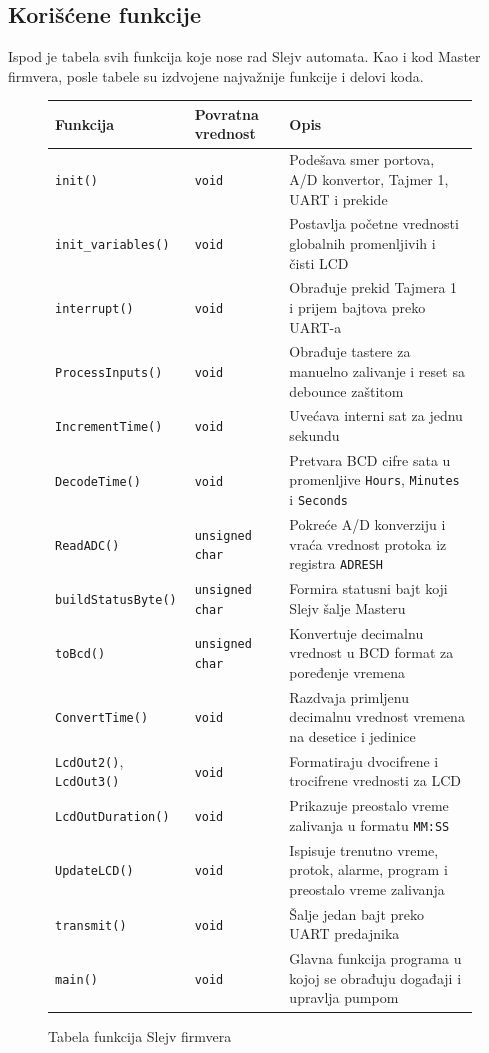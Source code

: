 \documentclass[12pt]{article}
\numberwithin{figure}{section}
\begin{document}
  \clearpage

  \subsection{Korišćene funkcije}
  Ispod je tabela svih funkcija koje nose rad Slejv automata. Kao i kod Master firmvera, posle tabele su izdvojene najvažnije funkcije i delovi koda.

  \begin{figure}[ht]
  \centering
  \small
  \begin{tabular}{|m{3.8cm}|m{3cm}|m{6.8cm}|}
    \hline
    Funkcija & Povratna vrednost & Opis \\ \hline
    \texttt{init()} & \texttt{void} & Podešava smer portova, A/D konvertor, Tajmer 1, UART i prekide \\ \hline
    \texttt{init\_variables()} & \texttt{void} & Postavlja početne vrednosti globalnih promenljivih i čisti LCD \\ \hline
    \texttt{interrupt()} & \texttt{void} & Obrađuje prekid Tajmera 1 i prijem bajtova preko UART-a \\ \hline
    \texttt{ProcessInputs()} & \texttt{void} & Obrađuje tastere za manuelno zalivanje i reset sa debounce zaštitom \\ \hline
    \texttt{IncrementTime()} & \texttt{void} & Uvećava interni sat za jednu sekundu \\ \hline
    \texttt{DecodeTime()} & \texttt{void} & Pretvara BCD cifre sata u promenljive \texttt{Hours}, \texttt{Minutes} i \texttt{Seconds} \\ \hline
    \texttt{ReadADC()} & \texttt{unsigned char} & Pokreće A/D konverziju i vraća vrednost protoka iz registra \texttt{ADRESH} \\ \hline
    \texttt{buildStatusByte()} & \texttt{unsigned char} & Formira statusni bajt koji Slejv šalje Masteru \\ \hline
    \texttt{toBcd()} & \texttt{unsigned char} & Konvertuje decimalnu vrednost u BCD format za poređenje vremena \\ \hline
    \texttt{ConvertTime()} & \texttt{void} & Razdvaja primljenu decimalnu vrednost vremena na desetice i jedinice \\ \hline
    \texttt{LcdOut2()}, \texttt{LcdOut3()} & \texttt{void} & Formatiraju dvocifrene i trocifrene vrednosti za LCD \\ \hline
    \texttt{LcdOutDuration()} & \texttt{void} & Prikazuje preostalo vreme zalivanja u formatu \texttt{MM:SS} \\ \hline
    \texttt{UpdateLCD()} & \texttt{void} & Ispisuje trenutno vreme, protok, alarme, program i preostalo vreme zalivanja \\ \hline
    \texttt{transmit()} & \texttt{void} & Šalje jedan bajt preko UART predajnika \\ \hline
    \texttt{main()} & \texttt{void} & Glavna funkcija programa u kojoj se obrađuju događaji i upravlja pumpom \\ \hline
  \end{tabular}
  \caption{Tabela funkcija Slejv firmvera}
  \end{figure}
  \normalsize
\end{document}
